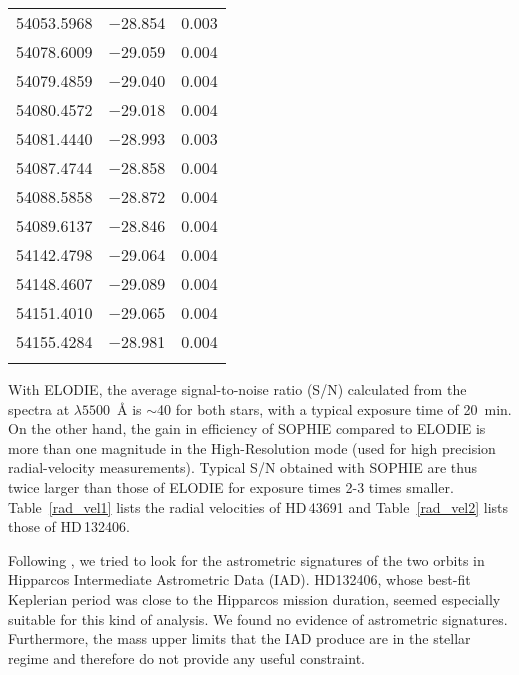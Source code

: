 \documentclass{aa}
\begin{document}
\begin{table}[t!]
\begin{tabular}{ccc}
54053.5968 & $-$28.854 & 0.003 \\
54078.6009 & $-$29.059 & 0.004 \\
54079.4859 & $-$29.040 & 0.004 \\
54080.4572 & $-$29.018 & 0.004 \\
54081.4440 & $-$28.993 & 0.003 \\
54087.4744 & $-$28.858 & 0.004 \\
54088.5858 & $-$28.872 & 0.004 \\
54089.6137 & $-$28.846 & 0.004 \\
54142.4798 & $-$29.064 & 0.004 \\
54148.4607 & $-$29.089 & 0.004 \\
54151.4010 & $-$29.065 & 0.004 \\
54155.4284 & $-$28.981 & 0.004 \\
\noalign{\smallskip}
\hline
\end{tabular}
\end{table}


With ELODIE, the average signal-to-noise ratio (S/N) calculated from the
spectra at $\lambda5500$~{\AA} is $\sim$40 for both stars, with a typical
exposure time of 20~min. On the other hand, the gain in efficiency of
SOPHIE compared to ELODIE is more than one magnitude in the High-Resolution
mode (used for high precision radial-velocity measurements). Typical S/N
obtained with SOPHIE are thus twice larger than those of ELODIE for
exposure times 2-3 times smaller. Table~\ref{rad_vel1} lists the radial
velocities of HD\,43691 and Table~\ref{rad_vel2} lists those of HD\,132406.

Following \citet{ZuckerMazeh2001}, we tried to look for the astrometric
signatures of the two orbits in Hipparcos Intermediate Astrometric Data
(IAD). HD132406, whose best-fit Keplerian period was close to the Hipparcos
mission duration, seemed especially suitable for this kind of analysis. We
found no evidence of astrometric signatures. Furthermore, the mass upper
limits that the IAD produce are in the stellar regime and therefore do not
provide any useful constraint.
\end{document}
